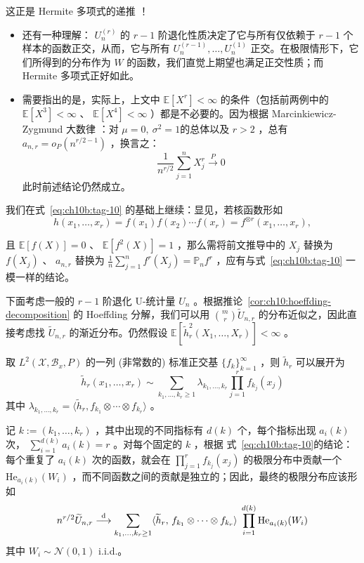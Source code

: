 \begin{example}
这正是 Hermite 多项式的递推 ！

\begin{remark}

\begin{itemize}
\tightlist
\item
  还有一种理解： $U_n^{(r)}$ 的 $r-1$ 阶退化性质决定了它与所有仅依赖于 $r-1$ 个样本的函数正交，从而，它与所有 $U_n^{(r-1)},\dots,U_n^{(1)}$ 正交。在极限情形下，它们所得到的分布作为 $W$ 的函数，我们直觉上期望也满足正交性质；而 Hermite 多项式正好如此。
\item
  需要指出的是，实际上，上文中 $\mathbb E[X^r]<\infty$ 的条件（包括前两例中的 $\mathbb E[X^3]<\infty$ 、 $\mathbb E[X^4]<\infty$ ）都是不必要的。因为根据 Marcinkiewicz-Zygmund 大数律 ：对 $\mu=0,\ \sigma^2=1$的总体以及 $r>2$ ，总有 $a_{n,r}=o_P(n^{r/2-1})$ ，换言之： \[ \frac{1}{n^{r/2}}\sum_{j=1}^nX_j^r\overset{P}\to 0 \]此时前述结论仍然成立。
\end{itemize}
\end{remark}

我们在式~\eqref{eq:ch10b:tag-10} 的基础上继续：显见，若核函数形如
\[
h(x_1,\dots,x_r)=f(x_1)f(x_2)\cdots f(x_r)=f^{\otimes r}(x_1,\dots,x_r),
\]

且 $\mathbb E[f(X)]=0$ 、 $\mathbb E[f^2(X)]=1$ ，那么需将前文推导中的 $X_j$ 替换为 $f(X_j)$ 、 $a_{n,r}$ 替换为 $\textstyle\frac1n\sum_{j=1}^nf^r(X_j)=\mathbb P_nf^r$ ，应有与式~\eqref{eq:ch10b:tag-10} 一模一样的结论。

下面考虑一般的 $r-1$ 阶退化 U-统计量 $U_n$ 。根据推论~\ref{cor:ch10:hoeffding-decomposition} 的 Hoeffding 分解，我们可以用 $\binom mr \widetilde U_{n,r}$ 的分布近似之，因此直接考虑找 $\widetilde U_{n,r}$ 的渐近分布。仍然假设 $\mathbb {E}[\widetilde h_r^2(X_1,\dots,X_r)]<\infty$ 。

取 $L^2(\mathscr X,\mathscr B_x,P)$ 的一列 (非常数的) 标准正交基 $\{f_k\}_{k=1}^\infty$ ，则 $\widetilde h_r$ 可以展开为
\[\widetilde{h}_r(x_1,\dots,x_r) \sim \sum_{k_1,\dots,k_r \ge 1} \lambda_{k_1,\dots,k_r} \prod_{j=1}^r f_{k_j}(x_j)\]
其中 $\lambda_{k_1,\dots,k_r}=\langle \widetilde h_r,f_{k_1}\otimes \cdots\otimes f_{k_r}\rangle$ 。

记 $k:=(k_1,\dots,k_r)$ ，其中出现的不同指标有 $d(k)$ 个，每个指标出现 $a_i(k)$ 次， $\textstyle\sum_{i=1}^{d(k)}a_i(k)=r$ 。对每个固定的 $k$ ，根据 式~\eqref{eq:ch10b:tag-10}的结论：每个重复了 $a_i(k)$ 次的函数，就会在 $\textstyle \prod_{j=1}^r f_{k_j}(x_j)$ 的极限分布中贡献一个 $\mathrm{He}_{a_i(k)}(W_i)$ ，而不同函数之间的贡献是独立的；因此，最终的极限分布应该形如
\[n^{r/2}\widetilde U_{n,r} \overset{\rm d}\longrightarrow \sum_{k_1,\dots,k_r\ge 1} \langle \widetilde h_r,\, f_{k_1}\otimes\cdots\otimes f_{k_r}\rangle \; \prod_{i=1}^{d(k)} \mathrm{He}_{a_i(k)}(W_i)\]
其中 $W_i\sim \mathcal N(0,1)$ i.i.d.。

\end{example}

